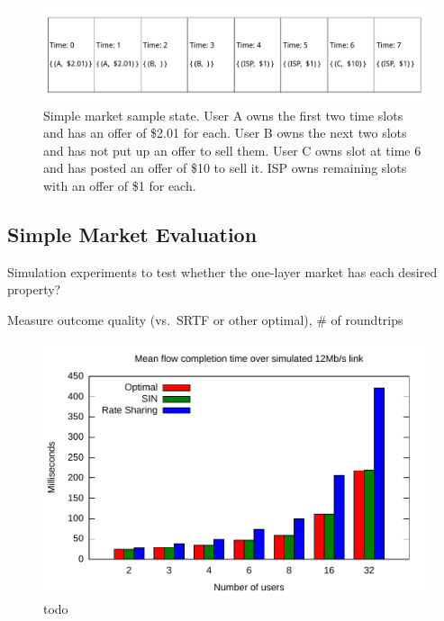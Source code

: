 \begin{figure}
\includegraphics[width=\columnwidth]{diagrams/simple_market.pdf}
\caption{Simple market sample state. User A owns the first two time slots and has an offer of \$2.01 for each. User B owns the next two slots and has not put up an offer to sell them. User C owns slot at time 6 and has posted an offer of \$10 to sell it. ISP owns remaining slots with an offer of \$1 for each.}
\label{f:simple_market}
\end{figure}

\subsection{Simple Market Evaluation}

Simulation experiments to test whether the one-layer market has each desired property?

Measure outcome quality (vs.~SRTF or other optimal), \# of roundtrips

\begin{figure}
\includegraphics[width=\columnwidth]{plots/delay_over_srtf.pdf}
\caption{todo}
\label{f:delay_over_srtf}
\end{figure}

